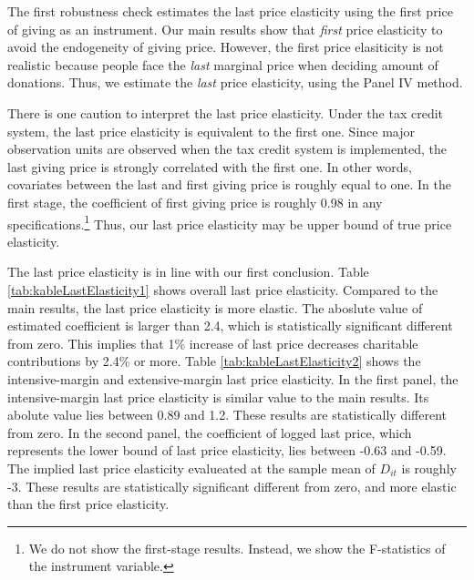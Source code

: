 \documentclass[ review  , 3p ]{elsarticle}
\begin{document}
  The first robustness check estimates the last price elasticity using the first price of giving as an instrument.
  Our main results show that \emph{first} price elasticity to avoid the endogeneity of giving price.
  However, the first price elasiticity is not realistic
  because people face the \emph{last} marginal price when deciding amount of donations.
  Thus, we estimate the \emph{last} price elasticity, using the Panel IV method.

  There is one caution to interpret the last price elasticity.
  Under the tax credit system, the last price elasticity is equivalent to the first one.
  Since major observation units are observed when the tax credit system is implemented,
  the last giving price is strongly correlated with the first one.
  In other words, covariates between the last and first giving price is roughly equal to one.
  In the first stage, the coefficient of first giving price is roughly 0.98 in any specifications.\footnote{We do not show the first-stage results. Instead, we show the F-statistics of the instrument variable.}
  Thus, our last price elasticity may be upper bound of true price elasticity.

  The last price elasticity is in line with our first conclusion.
  Table \ref{tab:kableLastElasticity1} shows overall last price elasticity.
  Compared to the main results, the last price elasticity is more elastic.
  The aboslute value of estimated coefficient is larger than 2.4,
  which is statistically significant different from zero.
  This implies that 1\% increase of last price decreases charitable contributions by 2.4\% or more.
  Table \ref{tab:kableLastElasticity2} shows the intensive-margin and extensive-margin last price elasticity.
  In the first panel,
  the intensive-margin last price elasticity is similar value to the main results.
  Its abolute value lies between 0.89 and 1.2.
  These results are statistically different from zero.
  In the second panel,
  the coefficient of logged last price, which represents the lower bound of last price elasticity,
  lies between -0.63 and -0.59.
  The implied last price elasticity evalueated at the sample mean of \(D_{it}\) is roughly -3.
  These results are statistically significant different from zero,
  and more elastic than the first price elasticity.
\end{document}
